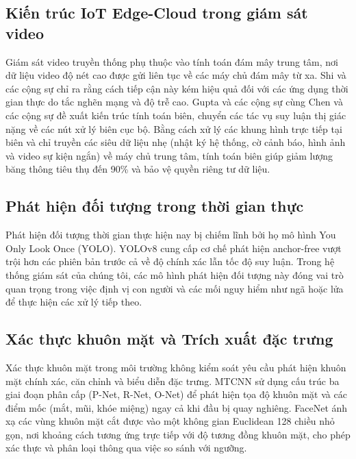 \documentclass[12pt,a4paper]{article}
\begin{document}
\subsection{Kiến trúc IoT Edge-Cloud trong giám sát video}
Giám sát video truyền thống phụ thuộc vào tính toán đám mây trung tâm, nơi dữ liệu video độ nét cao được gửi liên tục về các máy chủ đám mây từ xa. Shi và các cộng sự \cite{shi_edge_2016} chỉ ra rằng cách tiếp cận này kém hiệu quả đối với các ứng dụng thời gian thực do tắc nghẽn mạng và độ trễ cao. Gupta và các cộng sự \cite{gupta_ifogsim_2017} cùng Chen và các cộng sự \cite{chen_edge_2019} đề xuất kiến trúc tính toán biên, chuyển các tác vụ suy luận thị giác nặng về các nút xử lý biên cục bộ. Bằng cách xử lý các khung hình trực tiếp tại biên và chỉ truyền các siêu dữ liệu nhẹ (nhật ký hệ thống, cờ cảnh báo, hình ảnh và video sự kiện ngắn) về máy chủ trung tâm, tính toán biên giúp giảm lượng băng thông tiêu thụ đến 90\% và bảo vệ quyền riêng tư dữ liệu.

\subsection{Phát hiện đối tượng trong thời gian thực}
Phát hiện đối tượng thời gian thực hiện nay bị chiếm lĩnh bởi họ mô hình You Only Look Once (YOLO). YOLOv8 \cite{yolov8_2023} cung cấp cơ chế phát hiện anchor-free vượt trội hơn các phiên bản trước cả về độ chính xác lẫn tốc độ suy luận. Trong hệ thống giám sát của chúng tôi, các mô hình phát hiện đối tượng này đóng vai trò quan trọng trong việc định vị con người và các mối nguy hiểm như ngã hoặc lửa để thực hiện các xử lý tiếp theo.

\subsection{Xác thực khuôn mặt và Trích xuất đặc trưng}
Xác thực khuôn mặt trong môi trường không kiểm soát yêu cầu phát hiện khuôn mặt chính xác, căn chỉnh và biểu diễn đặc trưng. MTCNN \cite{mtcnn_2016} sử dụng cấu trúc ba giai đoạn phân cấp (P-Net, R-Net, O-Net) để phát hiện tọa độ khuôn mặt và các điểm mốc (mắt, mũi, khóe miệng) ngay cả khi đầu bị quay nghiêng. FaceNet \cite{facenet_2015} ánh xạ các vùng khuôn mặt cắt được vào một không gian Euclidean 128 chiều nhỏ gọn, nơi khoảng cách tương ứng trực tiếp với độ tương đồng khuôn mặt, cho phép xác thực và phân loại thông qua việc so sánh với ngưỡng.
\end{document}
